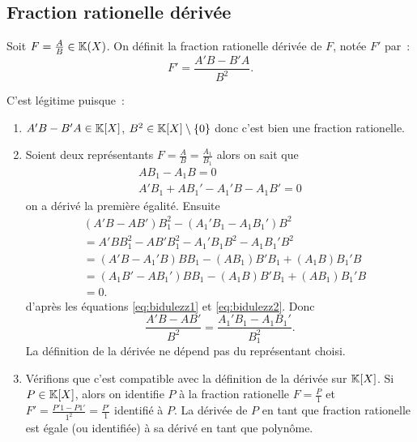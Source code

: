 \subsection{Fraction rationelle dérivée}

\begin{defdef}
  Soit $F=\frac{A}{B}\in\mathbb{K}(X)$. On définit la fraction rationelle dérivée de $F$, notée $F'$ par~:
  \begin{equation}
    F' = \frac{A'B-B'A}{B^2}.
  \end{equation}
\end{defdef}
C'est légitime puisque~:
\begin{enumerate}
\item $A'B-B'A \in \mathbb{K}[X]$, $B^2 \in \mathbb{K}[X] \setminus\{0\}$ donc c'est bien une fraction rationelle.
\item Soient deux représentants $F=\frac{A}{B}=\frac{A_1}{B_1}$ alors on sait que
  \begin{align}
    AB_1-A_1B = 0 \label{eq:bidulezz1}\\
    A'B_1 +AB_1' - A_1'B-A_1B'=0\label{eq:bidulezz2}
  \end{align}
  on a dérivé la première égalité. Ensuite
  \begin{align}
    &(A'B-AB')B_1^{2}-(A_1'B_1-A_1B_1')B^2\\
    &=A'BB_1^{2} - AB'B_1^{2} - A_1'B_1B^{2} -A_1B_1'B^{2} \\
    &=(A'B-A_1'B)BB_1 - (AB_1)B'B_1 +(A_1B)B_1'B\\
    &=(A_1B'-AB_1')BB_1 - (A_1B)B'B_1 +(AB_1)B_1'B\\
    &=0.
  \end{align}
  d'après les équations \eqref{eq:bidulezz1} et \eqref{eq:bidulezz2}. Donc
  \begin{equation}
    \frac{A'B-AB'}{B^2}=\frac{A_1'B_1-A_1B_1'}{B_1^{2}}.
  \end{equation}
  La définition de la dérivée ne dépend pas du représentant choisi.
\item Vérifions que c'est compatible avec la définition de la dérivée sur $\mathbb{K}[X]$. Si $P\in\mathbb{K}[X]$, alors on identifie $P$ à la fraction rationelle $F=\frac{P}{1}$ et $F'=\frac{P'1-P1'}{1^2}=\frac{P'}{1}$ identifié à $P$. La dérivée de $P$ en tant que fraction rationelle est égale (ou identifiée) à sa dérivé en tant que polynôme.
\end{enumerate}

